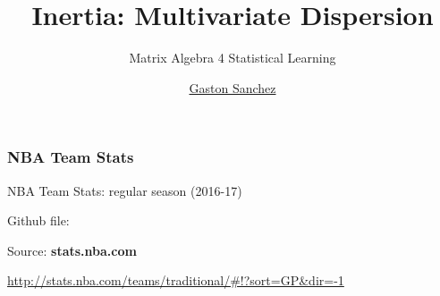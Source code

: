 \documentclass[12pt]{beamer}\usepackage[]{graphicx}\usepackage[]{color}
\title{Inertia: Multivariate Dispersion}
\subtitle{Matrix Algebra 4 Statistical Learning}
\author{\href{http://www.gastonsanchez.com}{Gaston Sanchez}}
\institute{\href{https://creativecommons.org/licenses/by-sa/4.0/}{\tt \scriptsize \color{foreground} CC BY-SA 4.0}}
\date{}
\begin{document}
{
  \frame{\titlepage} 
}


\begin{frame}
\begin{center}
\Huge{}
\end{center}
\end{frame}


\begin{frame}
\frametitle{NBA Team Stats}

\bbi
  \item NBA Team Stats: regular season (2016-17)
  \item Github file: 
  \item Source: \textbf{stats.nba.com}
  \item \url{http://stats.nba.com/teams/traditional/\#!?sort=GP\&dir=-1}
\ei

\end{frame}


{ %
    \begin{frame}[plain]
     \end{frame}
}

\end{document}
